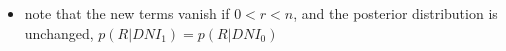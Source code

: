 \documentclass[../jaynes_prob_theory_notes.tex]{subfiles}
\begin{document}
\begin{itemize}
\begin{itemize}
                    \begin{itemize}
                        \item note that the new terms vanish if $0 < r < n$, and the posterior distribution is unchanged, $p(R|DNI_1) = p(R|DNI_0)$
                    \end{itemize}
            \end{itemize}

\end{itemize}
\end{document}
